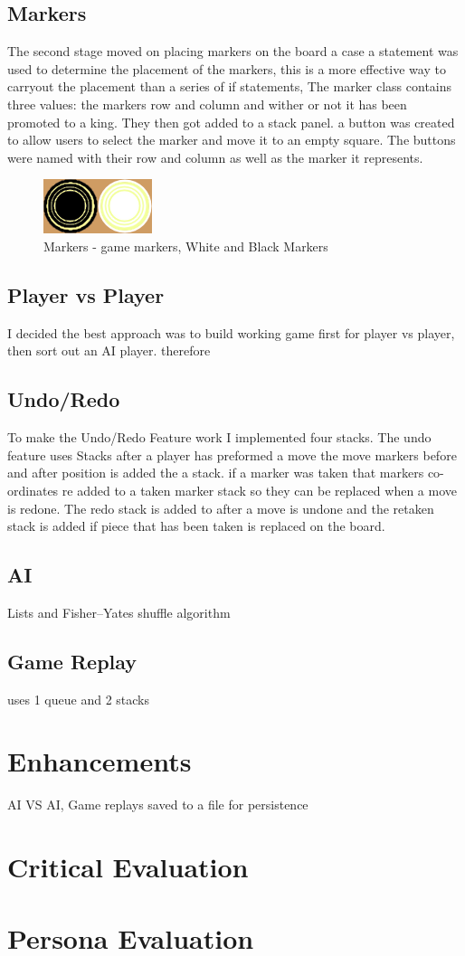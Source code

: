 \documentclass[10pt, a4paper]{article}
\begin{document}
	\subsection{Markers}
	The second stage moved on placing markers on the board a case a statement was used to determine the placement of the markers, this is a more effective way to carryout the placement than a series of if statements, The marker class contains three values: the markers row and column and wither or not it has been promoted to a king. They then got added to a stack panel. a button was created to allow users to select the marker and move it to an empty square. The buttons  were named with their row and column as well as the marker it represents.
	\begin{figure}[H]
  	\centering
  	\includegraphics[scale = 1.25]{Marker}
	\caption{Markers - game markers, White and Black Markers}
  	\label{fig:nonfloat}
	\end{figure}

	
	\subsection{Player vs Player}
	I decided the best approach was to build working game first for player vs player, then sort out an AI player. therefore 
	
	\subsection{Undo/Redo}
	To make the Undo/Redo Feature work I implemented four stacks. The undo feature uses Stacks after a player has preformed a move the move markers before and after position is added the a stack. if a marker was taken that markers co-ordinates re added to a taken marker stack so they can be replaced when a move is redone. The redo stack is added to after a move is undone and the retaken stack is added if piece that has been taken is replaced on the board.
	
	\subsection{AI}
	Lists and Fisher–Yates shuffle algorithm
	
	\subsection{Game Replay}
	uses 1 queue and 2 stacks 

	\section{Enhancements}
	AI VS AI, Game replays saved to a file for persistence
	
	\section{Critical Evaluation}
	

	\section{Persona Evaluation}
	
    
   
   


		
\end{document}
